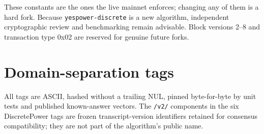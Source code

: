 \documentclass[11pt,a4paper]{article}
\newcommand{\code}[1]{\texttt{\small #1}}
\begin{document}
\noindent These constants are the ones the live mainnet enforces; changing any
of them is a hard fork. Because \code{yespower-discrete} is a new
algorithm, independent cryptographic review and benchmarking remain advisable. Block versions 2--8 and
transaction type 0x02 are reserved for genuine future forks.

\section{Domain-separation tags}\label{app:domains}

All tags are ASCII, hashed without a trailing NUL, pinned byte-for-byte by
unit tests and published known-answer vectors. The \code{/v2/} components in
the six DiscretePower tags are frozen transcript-version identifiers retained
for consensus compatibility; they are not part of the algorithm's public name.
\end{document}
